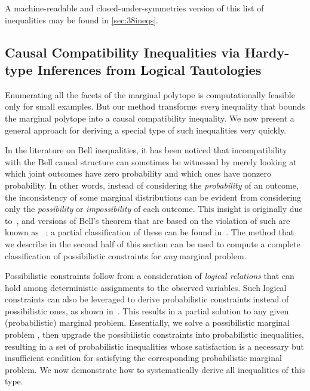 \documentclass[aps,english,10pt,superscriptaddress,onecolumn,twoside,longbibliography,pra,floatfix,fleqn,nofootinbib]{revtex4-1}
\newcommand*{\tblue}[1]{{\color{medblue}{\textbf{#1}}}}
\theoremstyle{definition}
\newcounter{example}[section]
\begin{document}
A machine-readable and closed-under-symmetries version of this list of inequalities may be found in \cref{sec:38ineqs}.

\subsection{Causal Compatibility Inequalities via Hardy-type Inferences from Logical Tautologies}\label{sec:TSEM}

Enumerating all the facets of the marginal polytope is computationally feasible only for small examples. But our method transforms \emph{every} inequality that bounds the marginal polytope into a causal compatibility inequality. We now present a general approach for deriving a special type of such inequalities very quickly.

In the literature on Bell inequalities, it has been noticed that incompatibility with the Bell causal structure can sometimes be witnessed by merely looking at which joint outcomes have zero probability and which ones have nonzero probability. In other words, instead of considering the \emph{probability} of an outcome, the inconsistency of some marginal distributions can be evident from considering only the \emph{possibility} or \emph{impossibility} of each outcome. This insight is originally due to~\citet{L.Hardy:PRL:1665}, and versions of Bell's theorem that are based on the violation of such \tblue{possibilistic constraints} are known as \tblue{Hardy-type paradoxes}~\cite{Garuccio95,CabelloHardyInequality,Braun08,Mancinska14,LSW}; a partial classification of these can be found in~\cite{Mansfield2012}. The method that we describe in the second half of this section can be used to compute a complete classification of possibilistic constraints for \emph{any} marginal problem.

Possibilistic constraints follow from a consideration of {\em logical relations} that can hold among deterministic assignments to the observed variables. Such logical constraints can also be leveraged to derive probabilistic constraints instead of possibilistic ones, as shown in~\cite{Pitowsky1989,Ghirardi08}. This results in a partial solution to any given (probabilistic) marginal problem. Essentially, we solve a possibilistic marginal problem \cite{Mansfield2012}, then upgrade the possibilistic constraints into probabilistic inequalities, resulting in a set of probabilistic inequalities whose satisfaction is a necessary but insufficient condition for satisfying the corresponding probabilistic marginal problem. We now demonstrate how to systematically derive all inequalities of this type.
\end{document}

